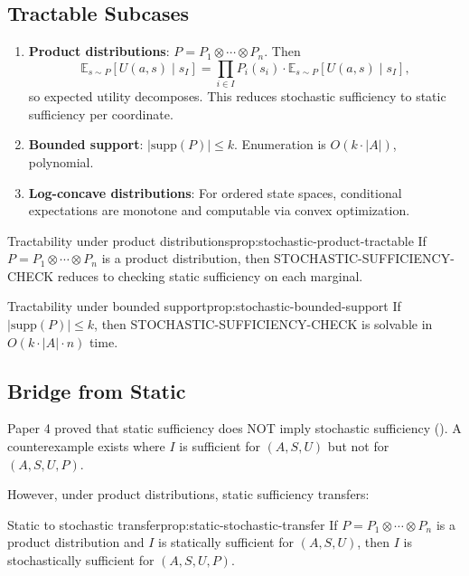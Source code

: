 
\subsection{Tractable Subcases}

\begin{enumerate}
\item \textbf{Product distributions}: $P = P_1 \otimes \cdots \otimes P_n$. Then
\[
\mathbb{E}_{s \sim P}[U(a,s) \mid s_I] = \prod_{i \in I} P_i(s_i) \cdot \mathbb{E}_{s \sim P}[U(a,s) \mid s_I],
\]
so expected utility decomposes. This reduces stochastic sufficiency to static sufficiency per coordinate.

\item \textbf{Bounded support}: $|\text{supp}(P)| \leq k$. Enumeration is $O(k \cdot |A|)$, polynomial.

\item \textbf{Log-concave distributions}: For ordered state spaces, conditional expectations are monotone and computable via convex optimization.
\end{enumerate}

\begin{claim}{Tractability under product distributions}{prop:stochastic-product-tractable}
If $P = P_1 \otimes \cdots \otimes P_n$ is a product distribution, then STOCHASTIC-SUFFICIENCY-CHECK reduces to checking static sufficiency on each marginal.
\end{claim}


\begin{claim}{Tractability under bounded support}{prop:stochastic-bounded-support}
If $|\text{supp}(P)| \leq k$, then STOCHASTIC-SUFFICIENCY-CHECK is solvable in $O(k \cdot |A| \cdot n)$ time.
\end{claim}


\subsection{Bridge from Static}

Paper 4 proved that static sufficiency does NOT imply stochastic sufficiency (). A counterexample exists where $I$ is sufficient for $(A,S,U)$ but not for $(A,S,U,P)$.

However, under product distributions, static sufficiency transfers:

\begin{claim}{Static to stochastic transfer}{prop:static-stochastic-transfer}
If $P = P_1 \otimes \cdots \otimes P_n$ is a product distribution and $I$ is statically sufficient for $(A,S,U)$, then $I$ is stochastically sufficient for $(A,S,U,P)$.
\end{claim}

